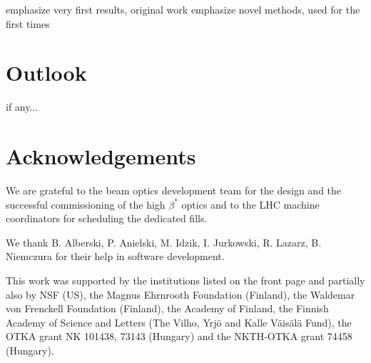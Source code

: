\documentclass[3p,twocolumn]{elsarticle}
\def\hang{\hangindent=\parindent}
\def\>{\par\vskip\itskip\parindent\itindent\indent\hang\llap{\hbox to3mm{$\bullet$\hss}}}
\def\>E{\par\vskip\itskip\parindent\itindent\indent\hang\llap{\hbox to3mm{\hss}}}
\def\>>{\par\vskip\iitskip\parindent\iitindent\indent\hang\llap{\hbox to\iitindent{\hss--\ }}}
\begin{document}
\> emphasize very first results, original work
\> emphasize novel methods, used for the first times



\section{Outlook}

\> if any...





\section*{Acknowledgements}
We are grateful to the beam optics development team for the design and the 
successful commissioning of the high $\beta^{*}$ optics and to the LHC machine 
coordinators for scheduling the dedicated fills.

We thank B. Alberski, P. Anielski, M. Idzik, I. Jurkowski, R. Lazarz, 
B. Niemczura for their help in software development.

This work was supported by the institutions listed on the front page and 
partially also by NSF (US), the Magnus Ehrnrooth Foundation (Finland), the 
Waldemar von Frenckell Foundation (Finland), the Academy of Finland, the 
Finnish Academy of Science and Letters (The Vilho, Yrj\"o and Kalle 
V\"ais\"al\"a Fund), the OTKA grant NK 101438, 73143 (Hungary) and the 
NKTH-OTKA grant 74458 (Hungary).
\end{document}
